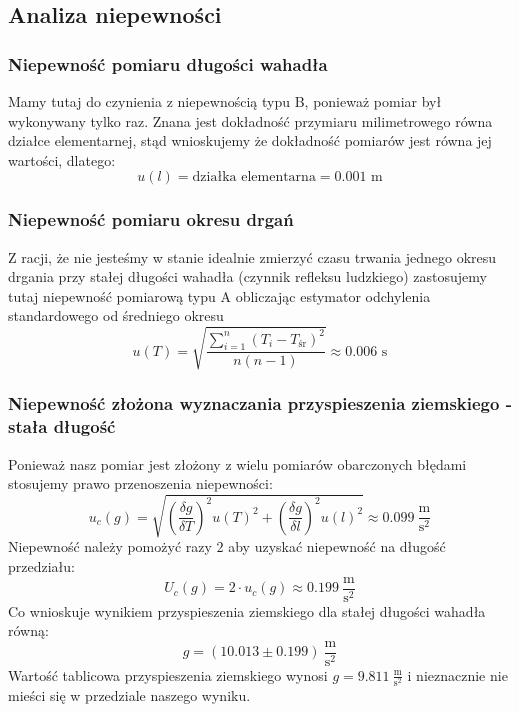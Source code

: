 \documentclass[a4paper,12pts]{article}
\begin{document}
	
	\subsection{Analiza niepewności}
	\label{analiza_niepewnosci}
	
	\subsubsection{Niepewność pomiaru długości wahadła}
	Mamy tutaj do czynienia z niepewnością typu B, ponieważ pomiar był wykonywany tylko raz. Znana jest dokładność przymiaru milimetrowego równa działce elementarnej, stąd wnioskujemy że dokładność pomiarów jest równa jej wartości, dlatego:
	\begin{equation}
		u(l) = \textrm{działka elementarna} = 0.001 \textrm{ m}
	\end{equation}
	
	\subsubsection{Niepewność pomiaru okresu drgań}
	Z racji, że nie jesteśmy w stanie idealnie zmierzyć czasu trwania jednego okresu drgania przy stałej długości wahadła (czynnik refleksu ludzkiego) zastosujemy tutaj niepewność pomiarową typu A obliczając estymator odchylenia standardowego od średniego okresu
	\begin{equation}
		u(T) = \sqrt{\frac{\sum_{i=1}^{n}(T_i - T_{\textrm{śr}})^2}{n(n-1)}} \approx 0.006 \textrm{ s}
	\end{equation}
	
	\subsubsection{Niepewność złożona wyznaczania przyspieszenia ziemskiego - stała długość}
	Ponieważ nasz pomiar jest złożony z wielu pomiarów obarczonych błędami stosujemy prawo przenoszenia niepewności:
	\begin{equation}
		u_c(g) = \sqrt{\left(\frac{\delta g}{\delta T}\right)^2 u(T)^2 + \left(\frac{\delta g}{\delta l}\right)^2 u(l)^2} \approx 0.099 ~\frac{\textrm{m}}{\textrm{s}^2}
	\end{equation}
	Niepewność należy pomożyć razy $2$ aby uzyskać niepewność na długość przedziału:
	\begin{equation}
	U_c(g) = 2 \cdot u_c(g) \approx 0.199 ~\frac{\textrm{m}}{\textrm{s}^2}
	\end{equation}
	Co wnioskuje wynikiem przyspieszenia ziemskiego dla stałej długości wahadła równą:
	$$ g = (10.013 \pm 0.199) ~\frac{\textrm{m}}{\textrm{s}^2} $$
	Wartość tablicowa przyspieszenia ziemskiego wynosi $g = 9.811 ~\frac{\textrm{m}}{\textrm{s}^2}$ i nieznacznie nie mieści się w przedziale naszego wyniku.
	
\end{document}
